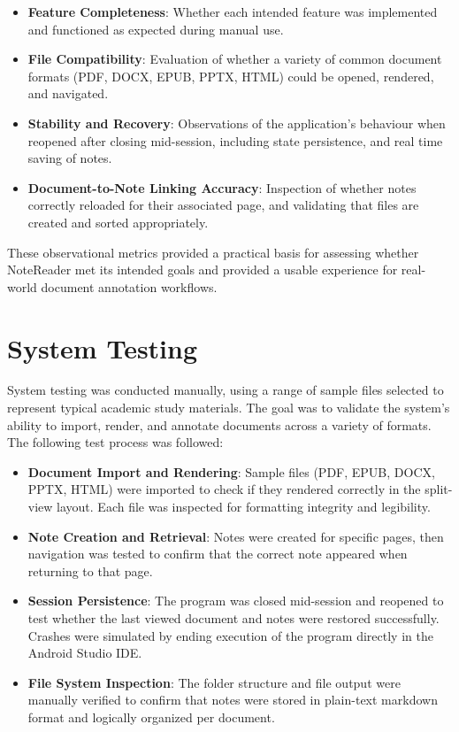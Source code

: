 \begin{itemize}
    \item \textbf{Feature Completeness}: Whether each intended feature was implemented and functioned as expected during manual use.
    \item \textbf{File Compatibility}: Evaluation of whether a variety of common document formats (PDF, DOCX, EPUB, PPTX, HTML) could be opened, rendered, and navigated.
    \item \textbf{Stability and Recovery}: Observations of the application's behaviour when reopened after closing mid-session, including state persistence, and real time saving of notes.
    \item \textbf{Document-to-Note Linking Accuracy}: Inspection of whether notes correctly reloaded for their associated page, and validating that files are created and sorted appropriately. 
\end{itemize}

These observational metrics provided a practical basis for assessing whether NoteReader met its intended goals and provided a usable experience for real-world document annotation workflows.



\section{System Testing}

System testing was conducted manually, using a range of sample files selected to represent typical academic study materials. The goal was to validate the system’s ability to import, render, and annotate documents across a variety of formats. The following test process was followed:

\begin{itemize}
    \item \textbf{Document Import and Rendering}: Sample files (PDF, EPUB, DOCX, PPTX, HTML) were imported to check if they rendered correctly in the split-view layout. Each file was inspected for formatting integrity and legibility.
    \item \textbf{Note Creation and Retrieval}: Notes were created for specific pages, then navigation was tested to confirm that the correct note appeared when returning to that page.
    \item \textbf{Session Persistence}: The program was closed mid-session and reopened to test whether the last viewed document and notes were restored successfully. Crashes were simulated by ending execution of the program directly in the Android Studio IDE. 
    \item \textbf{File System Inspection}: The folder structure and file output were manually verified to confirm that notes were stored in plain-text markdown format and logically organized per document.
\end{itemize}

